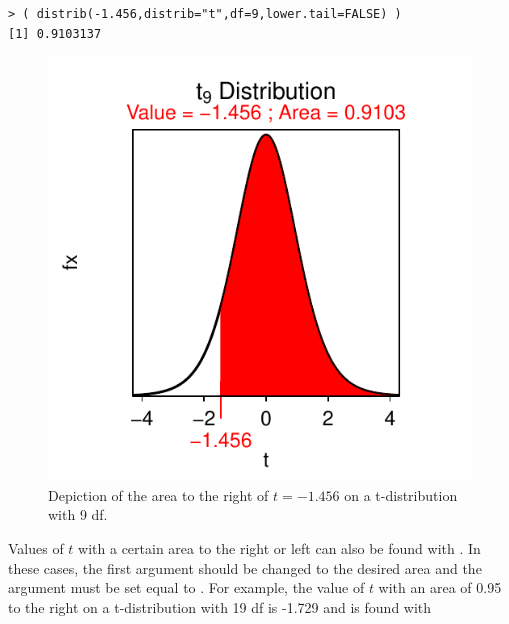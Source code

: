 \documentclass[10pt,openany]{book}\usepackage[]{graphicx}\usepackage[]{color}
\makeatletter
\newenvironment{kframe}{%
 \def\at@end@of@kframe{}%
 \ifinner\ifhmode%
  \def\at@end@of@kframe{\end{minipage}}%
  \begin{minipage}{\columnwidth}%
 \fi\fi%
 \def\FrameCommand##1{\hskip\@totalleftmargin \hskip-\fboxsep
 \colorbox{shadecolor}{##1}\hskip-\fboxsep
     \hskip-\linewidth \hskip-\@totalleftmargin \hskip\columnwidth}%
 \MakeFramed {\advance\hsize-\width
   \@totalleftmargin\z@ \linewidth\hsize
   \@setminipage}}%
 {\par\unskip\endMakeFramed%
 \at@end@of@kframe}
\newenvironment{knitrout}{}{} %
\makeatother
\begin{document}
\begin{knitrout}
\color{fgcolor}\begin{kframe}
\begin{verbatim}
> ( distrib(-1.456,distrib="t",df=9,lower.tail=FALSE) )
[1] 0.9103137
\end{verbatim}
\end{kframe}\begin{figure}[hbtp]

{\centering \includegraphics[width=.4\linewidth]{Figs/tarea1-1} 

}

\caption[Depiction of the area to the right of $t=-1.456$ on a t-distribution with 9 df]{Depiction of the area to the right of $t=-1.456$ on a t-distribution with 9 df.}\label{fig:tarea1}
\end{figure}


\end{knitrout}

Values of $t$ with a certain area to the right or left can also be found with .  In these cases, the first argument should be changed to the desired area and the  argument must be set equal to .  For example, the value of $t$ with an area of 0.95 to the right on a t-distribution with 19 df is -1.729  and is found with
\end{document}
